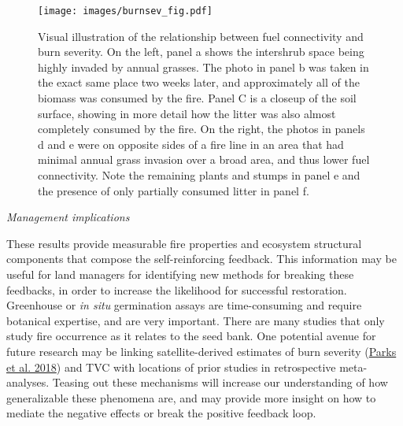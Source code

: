 \documentclass[
  12pt,
]{article}
\begin{document}
\begin{figure}
\centering
\texttt{[image: images/burnsev\_fig.pdf]}
\caption{Visual illustration of the relationship between fuel
connectivity and burn severity. On the left, panel a shows the
intershrub space being highly invaded by annual grasses. The photo in
panel b was taken in the exact same place two weeks later, and
approximately all of the biomass was consumed by the fire. Panel C is a
closeup of the soil surface, showing in more detail how the litter was
also almost completely consumed by the fire. On the right, the photos in
panels d and e were on opposite sides of a fire line in an area that had
minimal annual grass invasion over a broad area, and thus lower fuel
connectivity. Note the remaining plants and stumps in panel e and the
presence of only partially consumed litter in panel f.}
\end{figure}

\emph{Management implications}

These results provide measurable fire properties and ecosystem
structural components that compose the self-reinforcing feedback. This
information may be useful for land managers for identifying new methods
for breaking these feedbacks, in order to increase the likelihood for
successful restoration. Greenhouse or \emph{in situ} germination assays
are time-consuming and require botanical expertise, and are very
important. There are many studies that only study fire occurrence as it
relates to the seed bank. One potential avenue for future research may
be linking satellite-derived estimates of burn severity
(\protect\hyperlink{ref-Parks2018}{Parks et al. 2018}) and TVC with
locations of prior studies in retrospective meta-analyses. Teasing out
these mechanisms will increase our understanding of how generalizable
these phenomena are, and may provide more insight on how to mediate the
negative effects or break the positive feedback loop.
\end{document}

